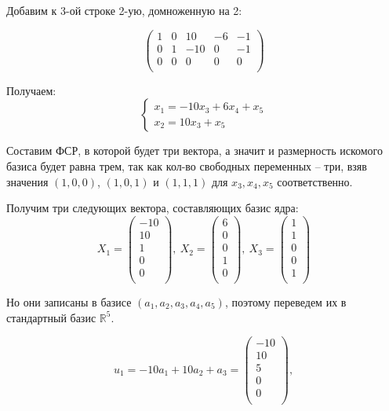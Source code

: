 	Добавим к 3-ой строке 2-ую, домноженную на 2:
	
	\[
	\begin{pmatrix}
	1 & 0 & 10 & -6 & -1 \\
	0 & 1 & -10 & 0 & -1 \\
	0 & 0 & 0 & 0 & 0 \\
	\end{pmatrix}
	\]
	
	Получаем:
	\[
	\begin{cases}
	x_1 = -10x_3 + 6x_4 + x_5 \\
	x_2 = 10x_3 + x_5 
	\end{cases}
	\]
	
	Составим ФСР, в которой будет три вектора, а значит и размерность искомого базиса будет равна трем, так как кол-во свободных переменных -- три, взяв значения $(1,0, 0)$, $(1, 0, 1)$ и $(1, 1, 1)$ для $x_3, x_4, x_5$ соответственно. 
	
	Получим три следующих вектора, составляющих базис ядра:
	\[ X_1 = 
	\begin{pmatrix}
	-10 \\
	10  \\
	1 \\
	0 \\
	0 \\
	\end{pmatrix},\ 
	X_2 = 
	\begin{pmatrix}
	6 \\
	0 \\
	0 \\
	1 \\
	0 \\
	\end{pmatrix},\ 
	X_3 = 
	\begin{pmatrix}
	1 \\
	1  \\
	0 \\
	0 \\
	1 \\
	\end{pmatrix}
	\]
	
	Но они записаны в базисе $(a_1, a_2, a_3, a_4, a_5)$, поэтому переведем их в стандартный базис $\mathbb{R}^5$.

	
	\[ u_1 = -10a_1 + 10a_2 + a_3 =  
	\begin{pmatrix}
	-10 \\
	10  \\
	5 \\
	0 \\
	0 \\
	\end{pmatrix}, \]
	
